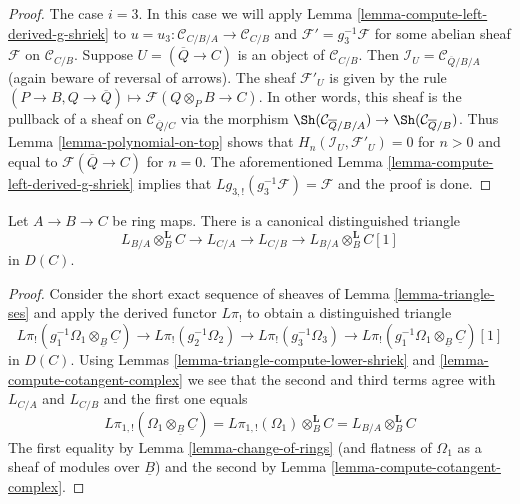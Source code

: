 \begin{proof}
\medskip\noindent
The case $i = 3$. In this case we will apply
Lemma \ref{lemma-compute-left-derived-g-shriek}
to $u = u_3 : \mathcal{C}_{C/B/A} \to \mathcal{C}_{C/B}$
and $\mathcal{F}' = g_3^{-1}\mathcal{F}$ for some abelian sheaf
$\mathcal{F}$ on $\mathcal{C}_{C/B}$.
Suppose $U = (\overline{Q} \to C)$ is an object of $\mathcal{C}_{C/B}$.
Then $\mathcal{I}_U = \mathcal{C}_{\overline{Q}/B/A}$ (again beware
of reversal of arrows). The sheaf $\mathcal{F}'_U$ is given by the
rule $(P \to B, Q \to \overline{Q}) \mapsto \mathcal{F}(Q \otimes_P B \to C)$.
In other words, this sheaf is the pullback of a sheaf
on $\mathcal{C}_{\overline{Q}/C}$ via the morphism
$\Sh(\mathcal{C}_{\overline{Q}/B/A}) \to \Sh(\mathcal{C}_{\overline{Q}/B})$.
Thus Lemma \ref{lemma-polynomial-on-top} shows that
$H_n(\mathcal{I}_U, \mathcal{F}'_U) = 0$ for $n > 0$
and equal to $\mathcal{F}(\overline{Q} \to C)$ for $n = 0$.
The aforementioned Lemma \ref{lemma-compute-left-derived-g-shriek}
implies that $Lg_{3, !}(g_3^{-1}\mathcal{F}) = \mathcal{F}$ and
the proof is done.
\end{proof}

\begin{proposition}
\label{proposition-triangle}
Let $A \to B \to C$ be ring maps. There is a canonical distinguished
triangle
$$
L_{B/A} \otimes_B^\mathbf{L} C \to L_{C/A} \to L_{C/B} \to
L_{B/A} \otimes_B^\mathbf{L} C[1]
$$
in $D(C)$.
\end{proposition}

\begin{proof}
Consider the short exact sequence of sheaves of
Lemma \ref{lemma-triangle-ses}
and apply the derived functor $L\pi_!$ to obtain a distinguished
triangle
$$
L\pi_!(g_1^{-1}\Omega_1 \otimes_{\underline{B}} \underline{C}) \to
L\pi_!(g_2^{-1}\Omega_2) \to
L\pi_!(g_3^{-1}\Omega_3) \to
L\pi_!(g_1^{-1}\Omega_1 \otimes_{\underline{B}} \underline{C})[1]
$$
in $D(C)$. Using Lemmas \ref{lemma-triangle-compute-lower-shriek} and
\ref{lemma-compute-cotangent-complex}
we see that the second and third terms agree with $L_{C/A}$ and $L_{C/B}$
and the first one equals
$$
L\pi_{1, !}(\Omega_1 \otimes_{\underline{B}} \underline{C}) =
L\pi_{1, !}(\Omega_1) \otimes_B^\mathbf{L} C =
L_{B/A} \otimes_B^\mathbf{L} C
$$
The first equality by Lemma \ref{lemma-change-of-rings}
(and flatness of $\Omega_1$ as a sheaf of modules over $\underline{B}$)
and the second by Lemma \ref{lemma-compute-cotangent-complex}.
\end{proof}

